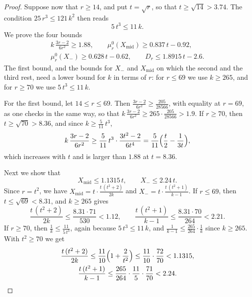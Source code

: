 \documentclass{amsart}
\theoremstyle{definition}
\theoremstyle{remark}
\numberwithin{equation}{section}
\begin{document}
\begin{proof}
Suppose now that $r\ge 14$, and put $t=\sqrt r$, so that $t\ge\sqrt{14}>3.74$. The condition $25\,r^3\le 121\,k^2$ then reads
\[
5\,t^3\le 11\,k .
\]
We prove the four bounds
\begin{gather*}
k\,\frac{3r-2}{6r^2}\ge 1.88,\qquad\mu^0_r(X_{\mathrm{mid}})\ge 0.837\,t-0.92,\\
\mu^0_r(X_-)\ge 0.628\,t-0.62,\qquad D_r\le 1.8915\,t-2.6 .
\end{gather*}
The first bound, and the bounds for $X_-$ and $X_{\mathrm{mid}}$ on which the second and the third rest, need a lower bound for $k$ in terms of $r$: for $r\le 69$ we use $k\ge 265$, and for $r\ge 70$ we use $5\,t^3\le 11\,k$.

For the first bound, let $14\le r\le 69$. Then $\frac{3r-2}{6r^2}\ge\frac{205}{28566}$, with equality at $r=69$, as one checks in the same way, so that $k\,\frac{3r-2}{6r^2}\ge 265\cdot\frac{205}{28566}>1.9$. If $r\ge 70$, then $t\ge\sqrt{70}>8.36$, and since $k\ge\frac{5}{11}\,t^3$,
\[
k\,\frac{3r-2}{6r^2}\ge\frac{5}{11}\,t^3\cdot\frac{3t^2-2}{6t^4}=\frac{5}{11}\Bigl(\frac t2-\frac{1}{3t}\Bigr),
\]
which increases with $t$ and is larger than $1.88$ at $t=8.36$.

Next we show that
\[
X_{\mathrm{mid}}\le 1.1315\,t,\qquad X_-\le 2.24\,t .
\]
Since $r=t^2$, we have $X_{\mathrm{mid}}=t\cdot\frac{t\,(t^2+2)}{2k}$ and $X_-=t\cdot\frac{t\,(t^2+1)}{k-1}$. If $r\le 69$, then $t\le\sqrt{69}<8.31$, and $k\ge 265$ gives
\[
\frac{t\,(t^2+2)}{2k}\le\frac{8.31\cdot 71}{530}<1.12,\qquad\frac{t\,(t^2+1)}{k-1}\le\frac{8.31\cdot 70}{264}<2.21 .
\]
If $r\ge 70$, then $\frac1k\le\frac{11}{5\,t^3}$, again because $5\,t^3\le 11\,k$, and $\frac{1}{k-1}\le\frac{265}{264}\cdot\frac1k$ since $k\ge 265$. With $t^2\ge 70$ we get
\begin{gather*}
\frac{t\,(t^2+2)}{2k}\le\frac{11}{10}\Bigl(1+\frac{2}{t^2}\Bigr)\le\frac{11}{10}\cdot\frac{72}{70}<1.1315,\\
\frac{t\,(t^2+1)}{k-1}\le\frac{265}{264}\cdot\frac{11}{5}\cdot\frac{71}{70}<2.24 .
\end{gather*}


\end{proof}
\end{document}
